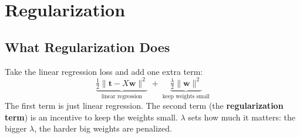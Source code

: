 \section*{Regularization}

\subsection*{What Regularization Does}

Take the linear regression loss and add one extra term:
\[
\underbrace{\tfrac{1}{2}\|\mathbf{t} - X\mathbf{w}\|^2}_{\text{linear regression}}
\;+\;
\underbrace{\tfrac{\lambda}{2}\|\mathbf{w}\|^2}_{\text{keep weights small}}
\]
The first term is just linear regression. The second term (the \textbf{regularization term}) is an incentive to keep the weights small. $\lambda$ sets how much it matters: the bigger $\lambda$, the harder big weights are penalized.

